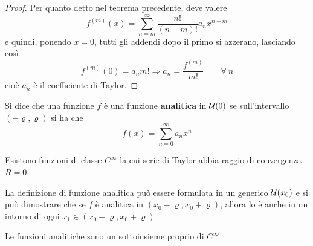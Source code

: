 \begin{proof}
Per quanto detto nel teorema precedente, deve valere
\begin{equation}
    f^{(m)}(x)= \sum\limits_{n=m}^{\infty}{\frac{n!}{(n-m)!} a_n x^{n-m}}
\end{equation}
e quindi, ponendo $x=0$, tutti gli addendi dopo il primo si azzerano, lasciando così
\begin{equation}
    f^{(m)}(0)=a_n m! \Rightarrow a_n=\frac{f^{(m)}}{m!} \qquad \forall\ n
\end{equation}
cioè $a_n$ è il coefficiente di Taylor.
\end{proof}
\begin{definition} \label{Def: Funzione analitica}
    Si dice che una funzione $f$ è una funzione \textbf{analitica} in $\mathcal{U}(0)$ se sull'intervallo $(-\varrho, \varrho)$ si ha che
    \begin{equation}
        f(x)= \sum\limits_{n=0}^{\infty}{a_n x^n}
    \end{equation}
\end{definition}
\begin{oss}
    Esistono funzioni di classe $C^\infty$ la cui serie di Taylor abbia raggio di convergenza $R=0$.
\end{oss}
\begin{oss}
    La definizione di funzione analitica può essere formulata in un generico $\mathcal{U}(x_0)$ e si può dimostrare che se $f$ è analitica in $(x_0-\varrho, x_0+\varrho)$, allora lo è anche in un intorno di ogni $x_1 \in (x_0-\varrho, x_0+\varrho)$.
\end{oss}
\begin{theorem}
    Le funzioni analitiche sono un sottoinsieme proprio di $C^\infty$
\end{theorem}
